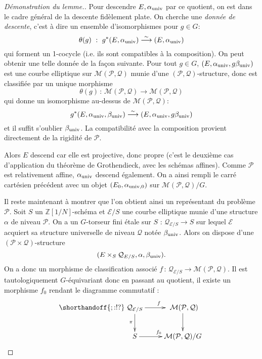 \documentclass[11pt,a4paper]{article}
\newcommand{\Z}{\mathbb{Z}}
\newcommand{\E}{\mathcal{E}}
\renewcommand{\Pr}{\mathcal{P}}
\newcommand{\Qr}{\mathcal{Q}}
\newcommand{\M}{\mathcal{M}}
\newcommand{\vers}{\longrightarrow}
\newcommand{\de}{\,:\,}
\theoremstyle{definition}
\begin{document}
\begin{proof}[Démonstration du lemme.]
Pour descendre $E, \alpha_{\mathrm{univ}}$ par ce quotient, on est dans le cadre général de la descente fidèlement plate. On cherche une \emph{donnée de descente}, c'est à dire un ensemble d'isomorphismes pour $g\in G$:
$$\theta(g)\ :\ g^*(E, \alpha_{\univ}) \overset{\sim}{\vers} (E, \alpha_{\univ})$$
qui forment un 1-cocycle (i.e. ils sont compatibles à la composition). On peut obtenir une telle donnée de la façon suivante. Pour tout $g\in G$, $(E, \alpha_{\mathrm{univ}}, g\beta_{\mathrm{univ}})$ est une courbe elliptique sur $\M(\Pr, \Qr)$ munie d'une $(\Pr,\Qr)$-structure, donc est classifiée par un unique morphisme
$$\theta(g) \de \M(\Pr,\Qr)\vers \M(\Pr,\Qr)$$
qui donne un isomorphisme au-dessus de $\M(\Pr,\Qr)$:
$$g^*(E, \alpha_\univ, \beta_\univ) \overset{\sim}{\vers} (E, \alpha_\univ, g\beta_\univ)$$
et il suffit s'oublier $\beta_{\mathrm{univ}}$. La compatibilité avec la composition provient directement de la rigidité de $\Pr$.

Alors $E$ descend car elle est projective, donc propre (c'est le deuxième cas d'application du théorème de Grothendieck, avec les schémas affines). Comme $\Pr$ est relativement affine, $\alpha_{\mathrm{univ}}$ descend également. On a ainsi rempli le carré cartésien précédent avec un objet $(E_0,\alpha_{\mathrm{univ}, 0})$ sur $\M(\Pr,\Qr)/G$.

Il reste maintenant à montrer que l'on obtient ainsi un représentant du problème $\Pr$. Soit $S$ un $\Z[1/N]$-schéma et $\E/S$ une courbe elliptique munie d'une structure $\alpha$ de niveau $\Pr$. On a un $G$-torseur fini étale sur $S$ : $\Qr_{\E/S}\vers S$ sur lequel $\E$ acquiert sa structure universelle de niveau $\Qr$ notée $\beta_{\mathrm{univ}}$. Alors on dispose d'une $(\Pr\times\Qr)$-structure
$$(E\times_S \Qr_{E/S}, \alpha, \beta_\univ).$$
On a donc un morphisme de classification associé $f \de \Qr_{\E/S}\vers \M(\Pr,\Qr)$. Il est tautologiquement $G$-équivariant donc en passant au quotient, il existe un morphisme $f_0$ rendant le diagramme commutatif :
$$
\shorthandoff{;:!?}
\xymatrix {
\Qr_{\E/S} \ar[d]_\pi \ar[r]^f &\ \M(\Pr,\Qr) \ar[d] \\
 S \ar[r]^{f_0} & \M(\Pr,\Qr)/G
}
$$


\end{proof}
\end{document}
